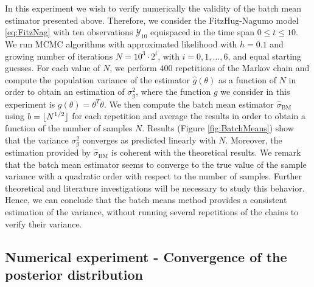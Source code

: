 In this experiment we wish to verify numerically the validity of the batch mean estimator presented above. Therefore, we consider the FitzHug-Nagumo model \eqref{eq:FitzNag} with ten observations $\mathcal{Y}_{10}$ equispaced in the time span $0 \leq t \leq 10$. We run MCMC algorithms with approximated likelihood with $h = 0.1$ and growing number of iterations $N = 10^3 \cdot 2^i$, with $i = 0, 1, \ldots, 6$, and equal starting guesses. For each value of $N$, we perform $400$ repetitions of the Markov chain and compute the population variance of the estimator $\hat g(\theta)$ as a function of $N$ in order to obtain an estimation of $\sigma^2_g$, where the function $g$ we consider in this experiment is $g(\theta) = \theta^T\theta$. We then compute the batch mean estimator $\hat \sigma_{\mathrm{BM}}$ using $b = \lfloor N^{1/2}\rfloor$ for each repetition and average the results in order to obtain a function of the number of samples $N$. Results (Figure \ref{fig:BatchMeans}) show that the variance $\sigma^2_g$ converges as predicted linearly with $N$. Moreover, the estimation provided by $\hat \sigma_{\mathrm{BM}}$ is coherent with the theoretical results. We remark that the batch mean estimator seems to converge to the true value of the sample variance with a quadratic order with respect to the number of samples. Further theoretical and literature investigations will be necessary to study this behavior. Hence, we can conclude that the batch means method provides a consistent estimation of the variance, without running several repetitions of the chains to verify their variance.


\subsection{Numerical experiment - Convergence of the posterior distribution}


